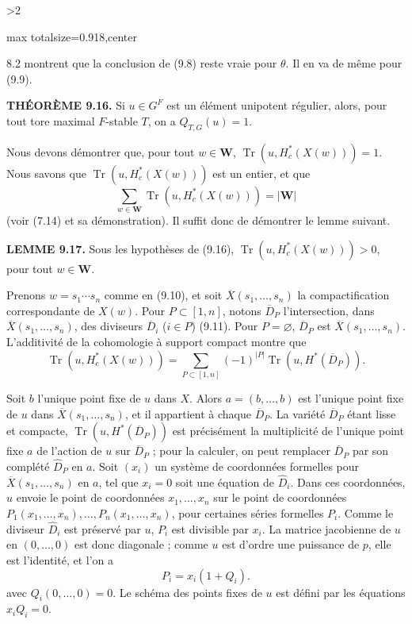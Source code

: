 \documentclass[9pt,twoside]{extarticle}
\newcommand{\EditionPage}[3]{%
  \ifnum#1>2\clearpage\fi
  \pdfbookmark[1]{Printed page #2}{fr-folio-#2}%
  \hypertarget{fr-physical-#1}{}%
  \noindent\begin{adjustbox}{max totalsize={\textwidth}{0.918\textheight},center}
  \begin{minipage}[t]{\textwidth}
  \fontsize{9.4}{11.1}\selectfont\justifying
  #3
  \end{minipage}
  \end{adjustbox}%
}
\begin{document}
\EditionPage{52}{153}{%
8.2 montrent que la conclusion de (9.8) reste vraie pour \(\theta\). Il en va de même pour (9.9).\par

\noindent\textbf{THÉORÈME 9.16.} Si \(u\in G^F\) est un élément unipotent régulier, alors, pour tout tore maximal \(F\)-stable \(T\), on a \(Q_{T,G}(u)=1\).\par

Nous devons démontrer que, pour tout \(w\in\mathbf W\), \(\operatorname{Tr}(u,H_c^*(X(w)))=1\). Nous savons que \(\operatorname{Tr}(u,H_c^*(X(w)))\) est un entier, et que \[
\sum_{w\in\mathbf W}\operatorname{Tr}(u,H_c^*(X(w)))=|\mathbf W|
\] (voir (7.14) et sa démonstration). Il suffit donc de démontrer le lemme suivant.\par

\noindent\textbf{LEMME 9.17.} Sous les hypothèses de (9.16), \(\operatorname{Tr}(u,H_c^*(X(w)))>0\), pour tout \(w\in\mathbf W\).\par

Prenons \(w=s_1\cdots s_n\) comme en (9.10), et soit \(\overline X(s_1,\ldots,s_n)\) la compactification correspondante de \(X(w)\). Pour \(P\subset[1,n]\), notons \(\overline D_P\) l'intersection, dans \(\overline X(s_1,\ldots,s_n)\), des diviseurs \(\overline D_i\) (\(i\in P\)) (9.11). Pour \(P=\varnothing\), \(\overline D_P\) est \(\overline X(s_1,\ldots,s_n)\). L'additivité de la cohomologie à support compact montre que \[
\tag{9.17.1}
\operatorname{Tr}(u,H_c^*(X(w)))
=
\sum_{P\subset[1,n]}(-1)^{|P|}\operatorname{Tr}(u,H^*(\overline D_P)).
\]\par

Soit \(b\) l'unique point fixe de \(u\) dans \(X\). Alors \(a=(b,\ldots,b)\) est l'unique point fixe de \(u\) dans \(\overline X(s_1,\ldots,s_n)\), et il appartient à chaque \(\overline D_P\). La variété \(\overline D_P\) étant lisse et compacte, \(\operatorname{Tr}(u,H^*(\overline D_P))\) est précisément la multiplicité de l'unique point fixe \(a\) de l'action de \(u\) sur \(\overline D_P\) ; pour la calculer, on peut remplacer \(\overline D_P\) par son complété \(\widehat D_P\) en \(a\). Soit \((x_i)\) un système de coordonnées formelles pour \(\overline X(s_1,\ldots,s_n)\) en \(a\), tel que \(x_i=0\) soit une équation de \(\widehat D_i\). Dans ces coordonnées, \(u\) envoie le point de coordonnées \(x_1,\ldots,x_n\) sur le point de coordonnées \(P_1(x_1,\ldots,x_n),\ldots,P_n(x_1,\ldots,x_n)\), pour certaines séries formelles \(P_i\). Comme le diviseur \(\widehat D_i\) est préservé par \(u\), \(P_i\) est divisible par \(x_i\). La matrice jacobienne de \(u\) en \((0,\ldots,0)\) est donc diagonale ; comme \(u\) est d'ordre une puissance de \(p\), elle est l'identité, et l'on a \[
P_i=x_i(1+Q_i).
\] avec \(Q_i(0,\ldots,0)=0\). Le schéma des points fixes de \(u\) est défini par les équations \(x_iQ_i=0\).\par

}
\end{document}
